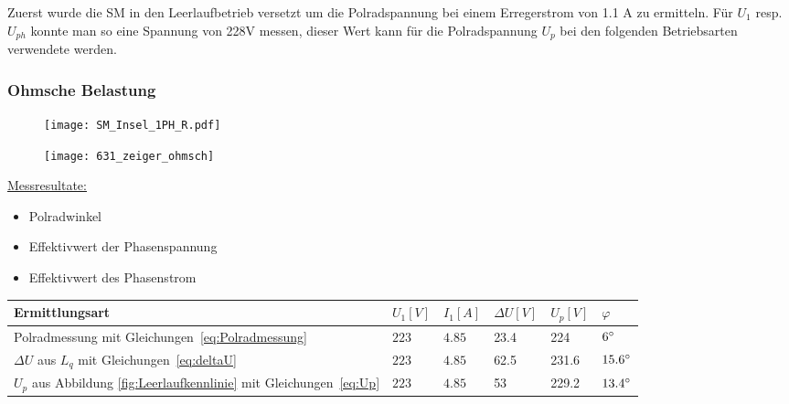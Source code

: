 \begin{flushleft}
Zuerst wurde die SM in den Leerlaufbetrieb versetzt um die Polradspannung bei einem Erregerstrom von 1.1 A zu ermitteln. Für $U_1$ resp. $U_{ph}$ konnte man so eine Spannung von 228V messen, dieser Wert kann für die Polradspannung $U_p$ bei den folgenden Betriebsarten verwendete werden. 

\subsubsection{Ohmsche Belastung}

\begin{figure}[H]
\begin{minipage}[t]{0.45\textwidth}
\centering
\texttt{[image: SM\_Insel\_1PH\_R.pdf]}
\label{fig:SM_Insel_1PH_R}
\end{minipage}
\begin{minipage}[t]{0.4\textwidth}
\centering
\texttt{[image: 631\_zeiger\_ohmsch]}
    \label{fig:ZeigerR}
\end{minipage}
\end{figure}


\underline{Messresultate:}\\
\vspace{0.3cm}

\begin{itemize}
\item \makebox[5cm][l]{$\varphi = 6\degree$  }            Polradwinkel
\item {}         Effektivwert der Phasenspannung
\item {}        Effektivwert des Phasenstrom    
\end{itemize}

\vspace{0.5cm}

\begin{tabular}{|l|l|l|l|l|l|}
 \hline
 \rowcolor[gray]{.8} \textbf{Ermittlungsart} & \textbf{$U_1 [V]$}&   \textbf{$I_1 [A]$} &\textbf{$\Delta U [V]$} & \textbf{$U_p [V]$} & \textbf{$\varphi$}\\
 \hline
 Polradmessung mit Gleichungen~\ref{eq:Polradmessung}& $223$ & $4.85$ & 23.4& 224& $6\degree$ \\
\hline
 $\Delta U$ aus $L_q$ mit Gleichungen~\ref{eq:deltaU} & $223$ & $4.85$ & 62.5& 231.6& $15.6\degree$ \\
\hline
 $U_p$ aus Abbildung \ref{fig:Leerlaufkennlinie} mit Gleichungen~\ref{eq:Up} & $223$ & $4.85$ & 53& 229.2&  $13.4\degree$\\
\hline
\end{tabular}


\end{flushleft}
